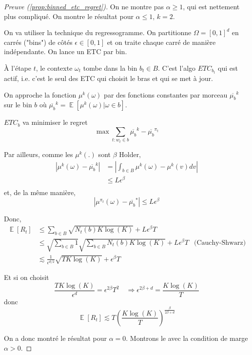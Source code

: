 \documentclass{article}
\DeclareMathOperator*{\E}{\mathbb{E}}
\theoremstyle{remark}
\theoremstyle{remark}
\begin{document}
\begin{proof}[Preuve (\autoref{prop:binned_etc_regret})]
   On ne montre pas $\alpha \geq 1$, qui est nettement plus compliqué. On montre le résultat pour $\alpha \leq 1$, $k = 2$.

   On va utiliser la technique du regressogramme. On partitionne $\Omega = [0,1]^d$ en carrés ("bins") de côtés $\epsilon \in [0,1]$ et on traite chaque carré de manière indépendante. On lance un ETC par bin.

   À l'étape $t$, le contexte $\omega_t$ tombe dans la bin $b_t \in B$. C'est l'algo $ETC_{b_t}$ qui est actif, i.e. c'est le seul des ETC qui choisit le bras et qui se met à jour.

   On approche la fonction $\mu^k(\omega)$ par des fonctions constantes par morceau $\overline{\mu_b}^k$ sur le bin $b$ où $\overline{\mu_b}^k = \E[\mu^k(\omega) | \omega \in b]$.

   $ETC_b$ va minimiser le regret
   $$
   \max \sum_{t : w_t \in b} \overline{\mu_b}^k - \overline{\mu_b}^{\pi_t}
   $$

   Par ailleurs, comme les $\mu^k(.)$ sont $\beta$ Holder,
   \begin{align*}
      |\mu^k(\omega) - \overline{\mu_b}^k| &= \left|\int_{b \in B} \mu^k(\omega) - \mu^k(v) dv \right| \\
      &\leq L \epsilon^\beta \\
   \end{align*}
   et, de la même manière,
   $$
   |\mu^{\pi_t}(\omega) - \overline{\mu_b}^*| \leq L \epsilon^\beta
   $$

   Donc,
   \begin{align*}
      \E[R_t] &\leq \sum_{b \in B} \sqrt{N_t(b) K \log(K)} + L \epsilon^\beta T \\
      &\leq \sqrt{\sum_{b \in B} 1} \sqrt{\sum_{b \in B} N_t(b) K \log(K)} + L \epsilon^\beta T & \text{(Cauchy-Shwarz)} \\
      &\lesssim \frac{1}{\epsilon^{d/2}} \sqrt{T K \log(K)} + \epsilon^\beta T
   \end{align*}

   Et si on choisit
   $$
   \frac{T K \log(K)}{\epsilon^d} = \epsilon^{2 \beta} T^2 \quad \Rightarrow \epsilon^{2\beta +d} = \frac{K \log(K)}{T}
   $$
   donc
   $$
   \E[R_t] \lesssim T \left(\frac{K \log(K)}{T}\right)^\frac{\beta}{2 \beta + d}
   $$

   On a donc montré le résultat pour $\alpha = 0$. Montrons le avec la condition de marge $\alpha > 0$.


\end{proof}
\end{document}
